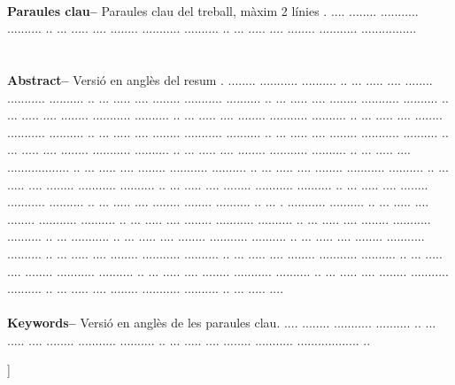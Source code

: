 ﻿\documentclass[10pt,a4paper,twocolumn,twoside]{article}
\begin{document}
\begin{@twocolumnfalse}
\begin{center}
{\\
\textbf{Paraules clau-- } Paraules clau del treball, màxim 2 línies . .... ........ ........... .......... ..  ... ..... .... ........ ........... .......... ..  ... ..... .... ........ ........... ................\\
\\
\bigskip
\\
\textbf{Abstract--} Versió en anglès del resum . ........ ........... .......... ..  ... ..... .... ........ ........... .......... ..  ... ..... .... ........ ........... .......... ..  ... ..... .... ........ ........... .......... ..  ... ..... .... ........ ........... .......... ..  ... ..... .... ........ ........... .......... ..  ... ..... .... ........ ........... .......... ..  ... ..... .... ........ ........... .......... ..  ... ..... .... ........ ........... .......... ..  ... ..... .... ........ ........... .......... ..  ... ..... .... ........ ........... .......... ..  ... ..... .... .................. ..  ... ..... .... ........ ........... .......... ..  ... ..... .... ........ ........... .......... ..  ... ..... .... ........ ........... .......... ..  ... ..... .... ........ ........... .......... ..  ... ..... .... ........ ........... .......... ..  ... ..... .... ........ ........ .......... ..  ... . ........... .......... ..  ... ..... .... ........ ........... .......... ..  ... ..... .... ........ ........... .......... ..  ... ..... .... ........ ........... .......... ..  ... ........... ..  ... ..... .... ........ ........... .......... ..  ... ..... .... ........ ........... .......... ..  ... ..... .... ........ ........... .......... ..  ... ..... .... ........ ........... .......... ..  ... ..... .... ........ ........... .......... ..  ... ..... .... ........ ........... .......... ..  ... ..... .... ........ ........... .......... ..  ... ..... .... ........ ........... .......... ..  ... ..... .... 
\\
\\
\textbf{Keywords-- } Versió en anglès de les paraules clau. .... ........ ........... .......... ..  ... ..... .... ........ ........... .......... ..  ... ..... .... ........ ........... .................. ..\\
}

\bigskip

{\vrule depth 0pt height 0.5pt width 4cm\hspace{7.5pt}%
%
\hspace{7.5pt}\vrule depth 0pt height 0.5pt width 4cm\relax}

\end{center}

\bigskip
\end{@twocolumnfalse}]
\end{document}
